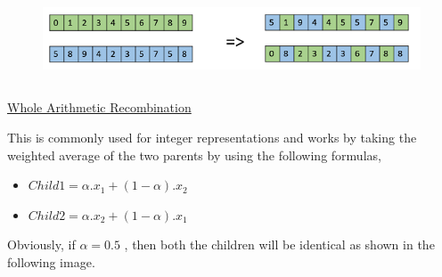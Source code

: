 \documentclass[12pt]{article}
\renewcommand{\_}{\kern-1.5pt\textunderscore\kern-1.5pt}
\begin{document}
\begin{enumerate}

\begin{figure}[H]
	\begin{Center}
		\includegraphics[width=6.25in,height=1.03in]{./media/image14.png}
	\end{Center}
\end{figure}



\setlength{\parskip}{0.0pt}
\par

\setlength{\parskip}{7.2pt}
\begin{justify}
{\fontsize{14pt}{16.8pt}\selectfont \uline{Whole Arithmetic Recombination}\par}
\end{justify}\par

\begin{justify}
This is commonly used for integer representations and works by taking the weighted average of the two parents by using the following formulas, 
\end{justify}\par

\setlength{\parskip}{3.72pt}
\begin{itemize}
	\item  \( Child1 =  \alpha .x_{1} +  \left( 1- \alpha  \right) .x_{2} \) \par

	\item  \( Child2 =  \alpha .x_{2} +  \left( 1- \alpha  \right) .x_{1} \) 
\end{itemize}\par

\setlength{\parskip}{7.2pt}
\begin{adjustwidth}{0.03in}{0.03in}
\begin{justify}
Obviously, if  \(  \alpha  = 0.5 \) , then both the children will be identical as shown in the following image.
\end{justify}\par


\end{adjustwidth}
\end{enumerate}
\end{document}
